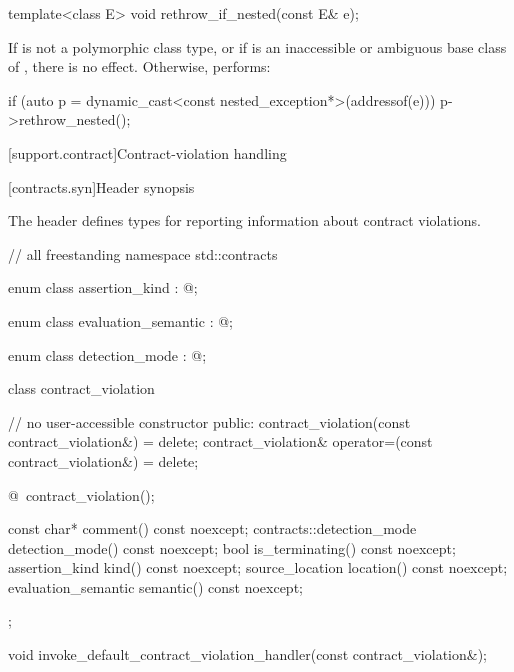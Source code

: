 %
\begin{itemdecl}
template<class E> void rethrow_if_nested(const E& e);
\end{itemdecl}

\begin{itemdescr}
\pnum
\effects
If  is not a polymorphic class type, or
if  is an inaccessible or ambiguous base class of ,
there is no effect.
Otherwise, performs:
\begin{codeblock}
if (auto p = dynamic_cast<const nested_exception*>(addressof(e)))
  p->rethrow_nested();
\end{codeblock}
\end{itemdescr}

[support.contract]{Contract-violation handling}

[contracts.syn]{Header  synopsis}

\pnum
The header  defines types
for reporting information about contract violations.

%
\begin{codeblock}
// all freestanding
namespace std::contracts {

  enum class assertion_kind : @;

  enum class evaluation_semantic : @;

  enum class detection_mode : @;

  class contract_violation {
    // no user-accessible constructor
  public:
    contract_violation(const contract_violation&) = delete;
    contract_violation& operator=(const contract_violation&) = delete;

    @\seebelow@ ~contract_violation();

    const char* comment() const noexcept;
    contracts::detection_mode detection_mode() const noexcept;
    bool is_terminating() const noexcept;
    assertion_kind kind() const noexcept;
    source_location location() const noexcept;
    evaluation_semantic semantic() const noexcept;
  };

  void invoke_default_contract_violation_handler(const contract_violation&);
}
\end{codeblock}

